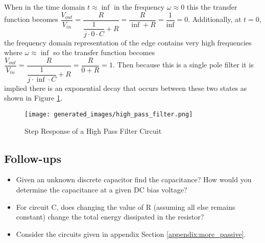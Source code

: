 \documentclass[main.tex]{subfiles}
\begin{document}
\newnoindentpara When in the time domain $t \approx \inf$ in the frequency $\omega \approx 0$ this the transfer function becomes $\dfrac{V_{out}}{V_{in}} = \dfrac{R}{\dfrac{1}{j \cdot 0 \cdot C} + R} = \dfrac{R}{\inf + R} = \dfrac{1}{\inf} = 0$. Additionally, at $t = 0$, the frequency domain representation of the edge contains very high frequencies where $\omega \approx \inf$ so the transfer function becomes $\dfrac{V_{out}}{V_{in}} = \dfrac{R}{\dfrac{1}{j \cdot \inf \cdot C} + R} = \dfrac{R}{0 + R} = 1$. Then because this is a single pole filter it is implied there is an exponential decay that occurs between these two states as shown in Figure \ref{fig:step-response-high-pass-filter}.

\begin{figure}[H]
    \centering
    \texttt{[image: generated\_images/high\_pass\_filter.png]}
    \caption{Step Response of a High Pass Filter Circuit}
    \label{fig:step-response-high-pass-filter}
\end{figure}


\subsection{Follow-ups}
\begin{itemize}
    \item Given an unknown discrete capacitor find the capacitance? How would you determine the capacitance at a given DC bias voltage? %
    \item For circuit C, does changing the value of R (assuming all else remains constant) change the total energy dissipated in the resistor? %
    \item Consider the circuits given in appendix Section \ref{appendix:more_passive}. %
\end{itemize}
\end{document}
